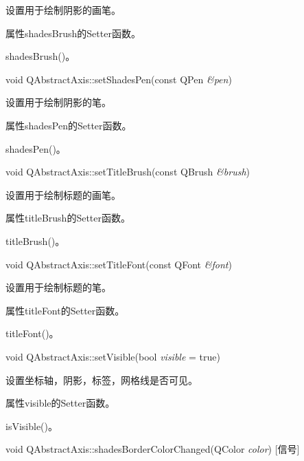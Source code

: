 设置用于绘制阴影的画笔。 

\begin{notice}
属性shadesBrush的Setter函数。
\end{notice}
         
\begin{seeAlso}
shadesBrush()。
\end{seeAlso}
    

void QAbstractAxis::setShadesPen(const QPen \emph{\&pen})

设置用于绘制阴影的笔。 

\begin{notice}
属性shadesPen的Setter函数。
\end{notice}
             
\begin{seeAlso}
shadesPen()。
\end{seeAlso}

void QAbstractAxis::setTitleBrush(const QBrush \emph{\&brush}) 

设置用于绘制标题的画笔。

\begin{notice}
属性titleBrush的Setter函数。
\end{notice}
    
\begin{seeAlso}
titleBrush()。
\end{seeAlso}

void QAbstractAxis::setTitleFont(const QFont \emph{\&font}) 

设置用于绘制标题的笔。

\begin{notice}
属性titleFont的Setter函数。
\end{notice}
        
\begin{seeAlso}
titleFont()。
\end{seeAlso}

void QAbstractAxis::setVisible(bool \emph{visible} = true) 

设置坐标轴，阴影，标签，网格线是否可见。 

\begin{notice}
属性visible的Setter函数。
\end{notice}
            
\begin{seeAlso}
isVisible()。
\end{seeAlso}

void QAbstractAxis::shadesBorderColorChanged(QColor \emph{color}) [信号] 

